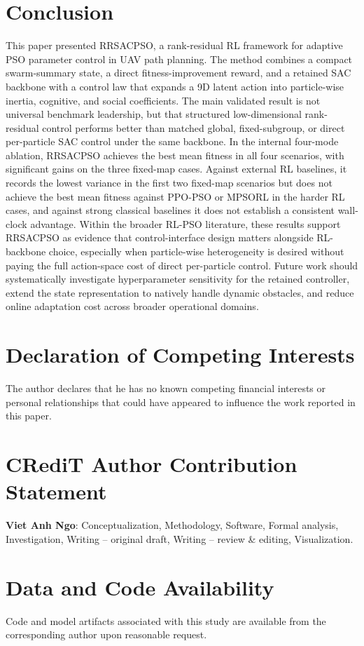 \documentclass[final,5p,times]{elsarticle}
\begin{document}
\section{Conclusion}
\label{sec:conclusion}
This paper presented RRSACPSO, a rank-residual RL framework for adaptive PSO parameter control in UAV path planning.
The method combines a compact swarm-summary state, a direct fitness-improvement reward, and a retained SAC backbone with a control law that expands a 9D latent action into particle-wise inertia, cognitive, and social coefficients.
The main validated result is not universal benchmark leadership, but that structured low-dimensional rank-residual control performs better than matched global, fixed-subgroup, or direct per-particle SAC control under the same backbone.
In the internal four-mode ablation, RRSACPSO achieves the best mean fitness in all four scenarios, with significant gains on the three fixed-map cases.
Against external RL baselines, it records the lowest variance in the first two fixed-map scenarios but does not achieve the best mean fitness against PPO-PSO or MPSORL in the harder RL cases, and against strong classical baselines it does not establish a consistent wall-clock advantage.
Within the broader RL-PSO literature, these results support RRSACPSO as evidence that control-interface design matters alongside RL-backbone choice, especially when particle-wise heterogeneity is desired without paying the full action-space cost of direct per-particle control.
Future work should systematically investigate hyperparameter sensitivity for the retained controller, extend the state representation to natively handle dynamic obstacles, and reduce online adaptation cost across broader operational domains.
\section*{Declaration of Competing Interests}
The author declares that he has no known competing financial interests or personal relationships that could have appeared to influence the work reported in this paper.

\section*{CRediT Author Contribution Statement}
\textbf{Viet Anh Ngo}: Conceptualization, Methodology, Software, Formal analysis, Investigation, Writing -- original draft, Writing -- review \& editing, Visualization.

\section*{Data and Code Availability}
Code and model artifacts associated with this study are available from the corresponding author upon reasonable request.


\end{document}
